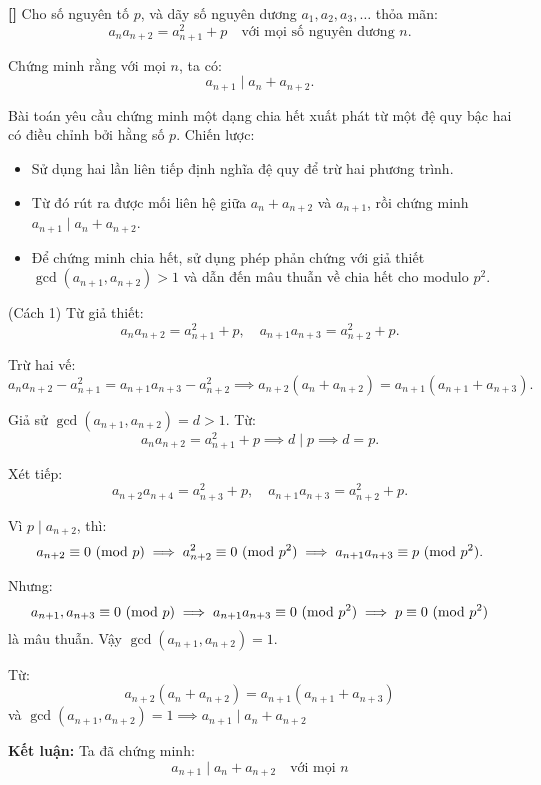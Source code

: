 \documentclass[../01-divisibility.tex]{subfiles}
\begin{document}
\begin{example*}\label{example:THA-2015-MO-P1}\textbf{[]}
	Cho số nguyên tố \( p \), và dãy số nguyên dương \( a_1, a_2, a_3, \dots \) thỏa mãn:
	\[
		a_n a_{n+2} = a_{n+1}^2 + p \quad \text{với mọi số nguyên dương } n.
	\]
	
	Chứng minh rằng với mọi \( n \), ta có:
	\[
		a_{n+1} \mid a_n + a_{n+2}.
	\]
\end{example*}

\begin{story*}
	Bài toán yêu cầu chứng minh một dạng chia hết xuất phát từ một đệ quy bậc hai có điều chỉnh bởi hằng số \( p \).
	Chiến lược:
	\begin{itemize}[topsep=0pt, partopsep=0pt, itemsep=0pt]
		\item Sử dụng hai lần liên tiếp định nghĩa đệ quy để trừ hai phương trình.
		\item Từ đó rút ra được mối liên hệ giữa \( a_n + a_{n+2} \) và \( a_{n+1} \), rồi chứng minh \( a_{n+1} \mid a_n + a_{n+2} \).
		\item Để chứng minh chia hết, sử dụng phép phản chứng với giả thiết \( \gcd(a_{n+1}, a_{n+2}) > 1 \) và dẫn đến mâu thuẫn về chia hết cho modulo \( p^2 \).
	\end{itemize}
\end{story*}

\bigbreak

\begin{soln}(Cách 1)\footnotemark
	Từ giả thiết:
	\[
		a_n a_{n+2} = a_{n+1}^2 + p,\quad a_{n+1} a_{n+3} = a_{n+2}^2 + p.
	\]

	Trừ hai vế:
	\[
		a_n a_{n+2} - a_{n+1}^2 = a_{n+1} a_{n+3} - a_{n+2}^2 \implies
		a_{n+2}(a_n + a_{n+2}) = a_{n+1}(a_{n+1} + a_{n+3}).
	\]

	Giả sử \( \gcd(a_{n+1}, a_{n+2}) = d > 1 \). Từ:
	\[
		a_n a_{n+2} = a_{n+1}^2 + p \implies d \mid p \implies d = p.
	\]

	Xét tiếp:
	\[
		a_{n+2} a_{n+4} = a_{n+3}^2 + p,\quad a_{n+1} a_{n+3} = a_{n+2}^2 + p.
	\]

	Vì \( p \mid a_{n+2} \), thì:
	\[
		a_{n+2} \equiv 0 \ (\mathrm{mod}\ p) \implies a_{n+2}^2 \equiv 0 \ (\mathrm{mod}\ p^2)
	\implies a_{n+1} a_{n+3} \equiv p \ (\mathrm{mod}\ p^2).
	\]

	Nhưng:
	\[
		a_{n+1}, a_{n+3} \equiv 0 \ (\mathrm{mod}\ p) \implies a_{n+1} a_{n+3} \equiv 0 \ (\mathrm{mod}\ p^2)
	\implies p \equiv 0 \ (\mathrm{mod}\ p^2)
	\]
	là mâu thuẫn. Vậy \( \gcd(a_{n+1}, a_{n+2}) = 1 \).

	Từ:
	\[
		a_{n+2}(a_n + a_{n+2}) = a_{n+1}(a_{n+1} + a_{n+3})
	\]
	và \( \gcd(a_{n+1}, a_{n+2}) = 1 \implies a_{n+1} \mid a_n + a_{n+2} \)

	\textbf{Kết luận:} Ta đã chứng minh:
	\[
		\boxed{a_{n+1} \mid a_n + a_{n+2} \quad \text{với mọi } n}
	\]
\end{soln}

\end{document}
